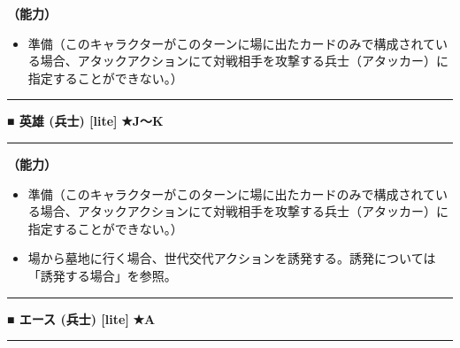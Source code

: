 \documentclass[twocolumn,a5paper,papersize,10pt]{jarticle}
\begin{document}
{\bf（能力）}


\vspace{-1zh}%
\begin{itemize}
\setlength{\leftskip}{-0.3cm}
\setlength{\parskip}{0pt} %

\item 準備（このキャラクターがこのターンに場に出たカードのみで構成されている場合、アタックアクションにて対戦相手を攻撃する兵士（アタッカー）に指定することができない。）
\vspace{-1zh}%
\end{itemize}
\vspace{2mm} %
\hrule height 0.5mm depth 0mm width 66.5mm %
\vspace{1mm} %
{\small\bf ■ 英雄 {\scriptsize (兵士) [lite]}} %
\hfill 
{\footnotesize\bf ★J〜K }

\vspace{1mm}%
\hrule height 0.1mm depth 0mm width 66.5mm %
\vspace{1mm}%

{\bf（能力）}


\vspace{-1zh}%
\begin{itemize}
\setlength{\leftskip}{-0.3cm}
\setlength{\parskip}{0pt} %

\item 準備（このキャラクターがこのターンに場に出たカードのみで構成されている場合、アタックアクションにて対戦相手を攻撃する兵士（アタッカー）に指定することができない。）

\item 場から墓地に行く場合、世代交代アクションを誘発する。誘発については「誘発する場合」を参照。
\vspace{-1zh}%
\end{itemize}
\vspace{2mm} %
\hrule height 0.5mm depth 0mm width 66.5mm %
\vspace{1mm} %
{\small\bf ■ エース {\scriptsize (兵士) [lite]}} %
\hfill 
{\footnotesize\bf ★A }

\vspace{1mm}%
\hrule height 0.1mm depth 0mm width 66.5mm %
\vspace{1mm}%
\end{document}
